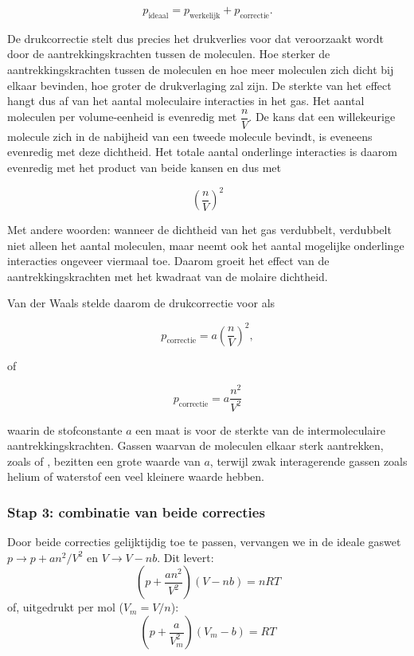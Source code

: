 \begin{equation*}
p_{\mathrm{ideaal}}
=
p_{\mathrm{werkelijk}}
+
p_{\mathrm{correctie}}.
\end{equation*}

De drukcorrectie stelt dus precies het drukverlies voor dat veroorzaakt wordt door de aantrekkingskrachten tussen de moleculen. Hoe sterker de aantrekkingskrachten tussen de moleculen en hoe meer moleculen zich dicht bij elkaar bevinden, hoe groter de drukverlaging zal zijn. De sterkte van het effect hangt dus af van het aantal moleculaire interacties in het gas. Het aantal moleculen per volume-eenheid is evenredig met $\dfrac{n}{V}$. De kans dat een willekeurige molecule zich in de nabijheid van een tweede molecule bevindt, is eveneens evenredig met deze dichtheid. Het totale aantal onderlinge interacties is daarom evenredig met het product van beide kansen en dus met

\[
\left(\frac{n}{V}\right)^2
\]

Met andere woorden: wanneer de dichtheid van het gas verdubbelt, verdubbelt niet alleen het aantal moleculen, maar neemt ook het aantal mogelijke onderlinge interacties ongeveer viermaal toe. Daarom groeit het effect van de aantrekkingskrachten met het kwadraat van de molaire dichtheid.

Van der Waals stelde daarom de drukcorrectie voor als

\begin{equation*}
p_{\mathrm{correctie}}
=
a\left(\frac{n}{V}\right)^2,
\end{equation*}

of

\begin{equation}
p_{\mathrm{correctie}}
=
a\frac{n^2}{V^2}
\end{equation}

waarin de stofconstante $a$ een maat is voor de sterkte van de intermoleculaire aantrekkingskrachten. Gassen waarvan de moleculen elkaar sterk aantrekken, zoals  of , bezitten een grote waarde van $a$, terwijl zwak interagerende gassen zoals helium of waterstof een veel kleinere waarde hebben.

\subsubsection{Stap 3: combinatie van beide correcties}

Door beide correcties gelijktijdig toe te passen, vervangen we in de ideale gaswet $p \to p + a n^2/V^2$ en $V \to V - nb$. Dit levert:
\begin{equation}
\boxed{\;\left(p + \frac{a n^2}{V^2}\right)(V - nb) = nRT\;}
\end{equation}
of, uitgedrukt per mol ($V_m = V/n$):
\begin{equation}
\boxed{\;\left(p + \frac{a}{V_m^2}\right)(V_m - b) = RT\;}
\end{equation}

